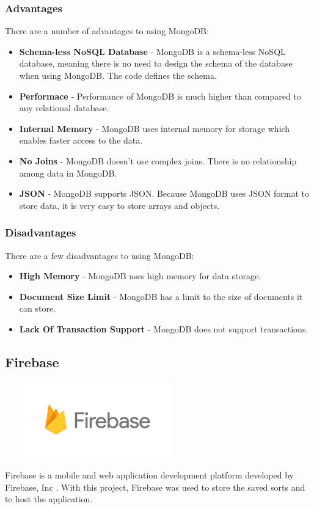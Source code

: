 \subsubsection{Advantages}
There are a number of advantages to using MongoDB:

\begin{itemize}
    \item \textbf{Schema-less NoSQL Database} - MongoDB is a schema-less NoSQL
    database, meaning there is no need to design the schema of the database when
    using MongoDB. The code defines the schema.
    \item \textbf{Performace} - Performance of MongoDB is much higher than
    compared to any relational database.
    \item \textbf{Internal Memory} - MongoDB uses internal memory for storage
    which enables faster access to the data.
    \item \textbf{No Joins} - MongoDB doesn't use complex joins. There is no
    relationship among data in MongoDB.
    \item \textbf{JSON} - MongoDB supports JSON. Because MongoDB uses JSON
    format to store data, it is very easy to store arrays and objects.
\end{itemize}

\subsubsection{Disadvantages}
There are a few disadvantages to using MongoDB:

\begin{itemize}
    \item \textbf{High Memory} - MongoDB uses high memory for data storage.
    \item \textbf{Document Size Limit} - MongoDB has a limit to the size of
    documents it can store.
    \item \textbf{Lack Of Transaction Support} - MongoDB does not support
    transactions.
\end{itemize}
\par
\medskip
\par
\medskip

\newpage
\subsection{Firebase}
\par
\medskip
\begin{center}
    \includegraphics[width=8cm,height=3.3cm,keepaspectratio]{images/firebase}
\end{center}
Firebase is a mobile and web application development platform developed by Firebase, Inc \cite{firebase_docs}. With this project, Firebase was used to store the saved sorts and to host the application.

